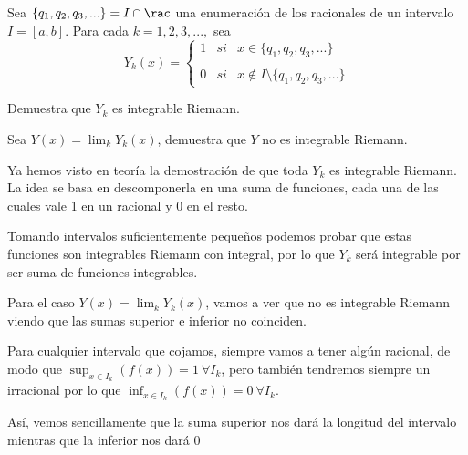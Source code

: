 \begin{problem}[3]
Sea $\{q_1,q_2,q_3,...\} = I \cap \rac$ una enumeración de los racionales de un intervalo $I=[a,b]$. Para cada $k=1,2,3,...,$ sea
\[Y_k(x)= \left\{ \begin{array}{lcc}
             1 &   si  & x \in \{q_1,q_2,q_3,...\} \\
             \\ 0 &  si  & x \notin I \setminus \{q_1,q_2,q_3,...\}
             \end{array}
   \right.\]

Demuestra que $Y_k$ es integrable Riemann.

Sea $Y(x)=\lim_kY_k(x)$, demuestra que $Y$ no es integrable Riemann.

\solution

Ya hemos visto en teoría la demostración de que toda $Y_k$ es integrable Riemann. La idea se basa en descomponerla en una suma de funciones, cada una de las cuales vale 1 en un racional y 0 en el resto.

Tomando intervalos suficientemente pequeños podemos probar que estas funciones son integrables Riemann con integral, por lo que $Y_k$ será integrable por ser suma de funciones integrables.

Para el caso $Y(x)=\lim_kY_k(x)$, vamos a ver que no es integrable Riemann viendo que las sumas superior e inferior no coinciden.

Para cualquier intervalo que cojamos, siempre vamos a tener algún racional, de modo que $\sup_{x \in I_k} (f(x)) = 1 \ \forall I_k$, pero también tendremos siempre un irracional por lo que $\inf_{x \in I_k} (f(x)) = 0 \ \forall I_k$.

Así, vemos sencillamente que la suma superior nos dará la longitud del intervalo mientras que la inferior nos dará 0
\end{problem}

